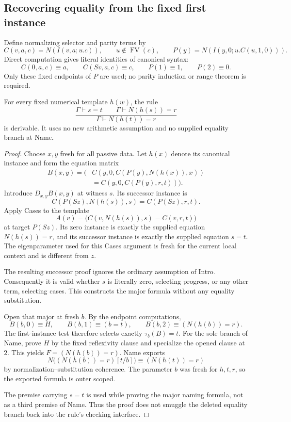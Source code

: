 \subsection{Recovering equality from the fixed first instance}

Define normalizing selector and parity terms by
\[
 C(v,a,c)=N(I(v,a;u.c)),\qquad u\notin\operatorname{FV}(c),
 \qquad P(y)=N(I(y,0;u.C(u,1,0))).
\]
Direct computation gives literal identities of canonical syntax:
\[
 C(0,a,c)\equiv a,\qquad C(Sv,a,c)\equiv c,
 \qquad P(1)\equiv1,\qquad P(2)\equiv0.
 \tag{Endpoints}\label{eq:det-endpoints}
\]
Only these fixed endpoints of $P$ are used; no parity induction or range
theorem is required.

\begin{theorem}
\label{thm:det-transport}
For every fixed numerical template $h(w)$, the rule
\[
 \frac{\Gamma\vdash s=t\qquad\Gamma\vdash N(h(s))=r}
      {\Gamma\vdash N(h(t))=r}
\]
is derivable. It uses no new arithmetic assumption and no supplied
equality branch at Name.
\end{theorem}
\begin{proof}
Choose $x,y$ fresh for all passive data. Let $h(x)$ denote its canonical
instance and form the equation matrix
\[
 \begin{split}
 B(x,y)=\bigl(&C(y,0,C(P(y),N(h(x)),x))\\
             &{}=C(y,0,C(P(y),r,t))\bigr).
 \end{split}
 \tag{Naming matrix}\label{eq:det-naming-matrix}
\]
Introduce $D_{x,y}B(x,y)$ at witness $s$. Its successor instance is
\[
 C(P(Sz),N(h(s)),s)=C(P(Sz),r,t).
\]
Apply Cases to the template
\[
       A(v)=\bigl(C(v,N(h(s)),s)=C(v,r,t)\bigr)
\]
at target $P(Sz)$. Its zero instance is exactly the supplied equation
$N(h(s))=r$, and its successor instance is exactly the supplied equation
$s=t$. The eigenparameter used for this Cases argument is fresh for the
current local context and is different from $z$.

The resulting successor proof ignores the ordinary assumption of Intro.
Consequently it is valid whether $s$ is literally zero, selecting progress,
or any other term, selecting cases. This constructs the major formula
without any equality substitution.

Open that major at fresh $b$. By the endpoint computations,
\[
 B(b,0)\equiv H,\qquad B(b,1)\equiv(b=t),
 \qquad B(b,2)\equiv(N(h(b))=r).
\]
The first-instance test therefore selects exactly $\tau_b(B)=t$.
For the sole branch of Name, prove $H$ by the fixed reflexivity clause
and specialize the opened clause at $2$. This yields
$F=(N(h(b))=r)$. Name exports
\[
 N\bigl((N(h(b))=r)[t/b]\bigr)
       \equiv (N(h(t))=r)
\]
by normalization--substitution coherence. The parameter $b$ was fresh
for $h,t,r$, so the exported formula is outer scoped.

The premise carrying $s=t$ is used while proving the major naming formula,
not as a third premise of Name. Thus the proof does not smuggle the deleted
equality branch back into the rule's checking interface.
\end{proof}

